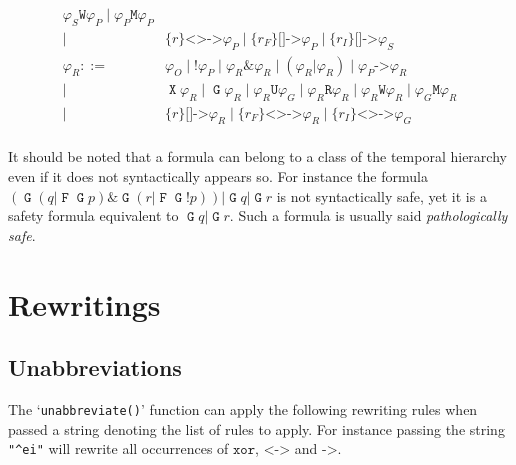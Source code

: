 \documentclass[a4paper,twoside,10pt,DIV=12]{scrreprt}
\DeclareMathOperator{\F}{\texttt{F}}
\DeclareMathOperator{\G}{\texttt{G}}
\newcommand{\U}{\mathbin{\texttt{U}}}
\newcommand{\R}{\mathbin{\texttt{R}}}
\DeclareMathOperator{\X}{\texttt{X}}
\newcommand{\M}{\mathbin{\texttt{M}}}
\newcommand{\W}{\mathbin{\texttt{W}}}
\DeclareMathOperator{\NOT}{\texttt{!}}
\newcommand{\XOR}{\mathbin{\texttt{xor}}}
\newcommand{\IMPLIES}{\mathbin{\texttt{->}}}
\newcommand{\EQUIV}{\mathbin{\texttt{<->}}}
\newcommand{\OR}{\mathbin{\texttt{|}}}
\newcommand{\AND}{\mathbin{\texttt{\&}}}
\newcommand{\0}{\texttt{0}}
\newcommand{\1}{\texttt{1}}
\newcommand{\Esuffix}{\texttt{<>->}}
\newcommand{\Asuffix}{\texttt{[]->}}
\newcommand{\sere}[1]{\texttt{\{}#1\texttt{\}}}
\begin{document}
\begin{align*}
                   \varphi_S\W\varphi_P\mid\varphi_P\M\varphi_P\\
           \mid{}& \sere{r}\Esuffix \varphi_P\mid
                   \sere{r_F}\Asuffix \varphi_P\mid
                   \sere{r_I}\Asuffix \varphi_S\\
  \varphi_R ::={}& \varphi_O \mid \NOT\varphi_P\mid
                   \varphi_R\AND \varphi_R\mid (\varphi_R\OR \varphi_R)\mid
                   \varphi_P\IMPLIES \varphi_R\\
           \mid{}& \X\varphi_R \mid \G\varphi_R \mid
                   \varphi_R\U\varphi_G\mid\varphi_R\R\varphi_R\mid
                   \varphi_R\W\varphi_R\mid\varphi_G\M\varphi_R\\
           \mid{}& \sere{r}\Asuffix \varphi_R\mid \sere{r_F}\Esuffix \varphi_R \mid \sere{r_I}\Esuffix \varphi_G\\
\end{align*}

It should be noted that a formula can belong to a class of the
temporal hierarchy even if it does not syntactically appears so.  For
instance the formula $(\G(q\OR \F\G p)\AND \G(r\OR \F\G\NOT p))\OR\G
q\OR \G r$ is not syntactically safe, yet it is a safety formula
equivalent to $\G q\OR \G r$.  Such a formula is usually said
\emph{pathologically safe}.

\chapter{Rewritings}

\section{Unabbreviations}\label{sec:unabbrev}

The `\verb=unabbreviate()=' function can apply the following rewriting
rules when passed a string denoting the list of rules to apply.  For
instance passing the string \texttt{"\^{}ei"} will rewrite all
occurrences of $\XOR$, $\EQUIV$ and $\IMPLIES$.
\end{document}
